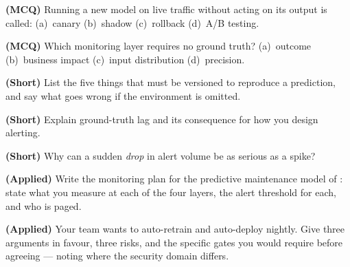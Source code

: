 \begin{reviewq}
  \item \textbf{(MCQ)} Running a new model on live traffic without acting on its
        output is called: (a)~canary (b)~shadow (c)~rollback (d)~A/B testing.
  \item \textbf{(MCQ)} Which monitoring layer requires no ground truth?
        (a)~outcome (b)~business impact (c)~input distribution (d)~precision.
  \item \textbf{(Short)} List the five things that must be versioned to reproduce a
        prediction, and say what goes wrong if the environment is omitted.
  \item \textbf{(Short)} Explain ground-truth lag and its consequence for how you
        design alerting.
  \item \textbf{(Short)} Why can a sudden \emph{drop} in alert volume be as serious as
        a spike?
  \item \textbf{(Applied)} Write the monitoring plan for the predictive maintenance
        model of : state what you measure at each of the four layers, the
        alert threshold for each, and who is paged.
  \item \textbf{(Applied)} Your team wants to auto-retrain and auto-deploy nightly.
        Give three arguments in favour, three risks, and the specific gates you would
        require before agreeing --- noting where the security domain differs.
\end{reviewq}
